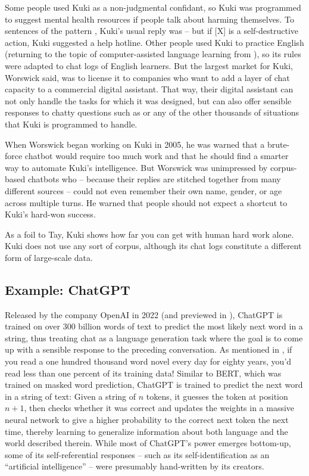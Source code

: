 Some people used Kuki as a non-judgmental confidant, so Kuki was programmed to suggest mental health resources if people talk about harming themselves.  To sentences of the pattern , Kuki's usual reply was  -- but if [X] is a self-destructive action, Kuki suggested a help hotline.  Other people used Kuki to practice English (returning to the topic of computer-assisted language learning from ), so its rules were adapted to chat logs of English learners.  But the largest market for Kuki, Worswick said, was to license it to companies who want to add a layer of chat capacity to a commercial digital assistant.  That way, their digital assistant can not only handle the tasks for which it was designed, but can also offer sensible responses to chatty questions such as  or any of the other thousands of situations that Kuki is programmed to handle.


When Worswick began working on Kuki in 2005, he was warned that a brute-force chatbot would require too much work and that he should find a smarter way to automate Kuki's intelligence.  But Worswick was unimpressed by corpus-based chatbots who -- because their replies are stitched together from many different sources -- could not even remember their own name, gender, or age across multiple turns.  He  warned that people should not expect a shortcut to Kuki's hard-won success. 

As a foil to Tay, Kuki shows how far you can get with human hard work alone.  Kuki does not use any sort of corpus, although its chat logs constitute a different form of large-scale data.  


\subsection{Example: ChatGPT}

Released by the company OpenAI in 2022 (and previewed in ), ChatGPT  is trained on over 300 billion words of text to predict the most likely next word in a string, thus treating chat as a language generation task where the goal is to come up with a sensible response to the preceding conversation.  As mentioned in , if you read a one hundred thousand word novel every day for eighty years, you'd read less than one percent of its training data!   Similar to BERT, which was trained on masked word prediction, ChatGPT is trained to predict the next word in a string of text: Given a string of $n$ tokens, it guesses the token at position $n+1$, then checks whether it was correct and updates the weights in a massive neural network to give a higher probability to the correct next token the next time, thereby learning to generalize information about both language and the world described therein.  While most of ChatGPT's power emerges bottom-up,  some of its self-referential responses -- such as its self-identification as an ``artificial intelligence'' -- were presumably hand-written by its creators. 

